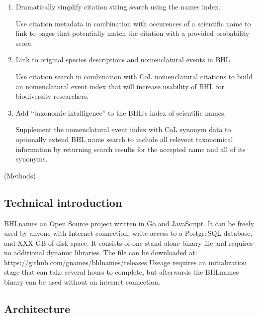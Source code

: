 \documentclass[
]{article}
\begin{document}
\begin{enumerate}
\def\labelenumi{\arabic{enumi}.}
\item
  Dramatically simplify citation string search using the names index.

  Use citation metadata in combination with occurences of a scientific
  name to link to pages that potentially match the citation with a
  provided probability score.
\item
  Link to original species descriptions and nomenclatural events in BHL.

  Use citation search in combination with CoL nomenclatural citations to
  build an nomenclatural event index that will increase usability of BHL
  for biodiversity researchers.
\item
  Add ``taxonomic intalligence'' to the BHL's index of scientific names.

  Supplement the nomenclatural event index with CoL synonym data to
  optionally extend BHL name search to include all relevent taxonomical
  information by returning search results for the accepted name and all
  of its synonyms.
\end{enumerate}

(Methods)

\hypertarget{technical-introduction}{%
\subsection{Technical introduction}\label{technical-introduction}}

BHLnames an Open Source project written in Go and JavaScript. It can be
freely used by anyone with Internet connection, write access to a
PostgreSQL database, and XXX GB of disk space. It consists of one
stand-alone binary file and requires no additional dynamic libraries.
The file can be downloaded at:
https://github.com/gnames/bhlnames/releases Useage requires an
initialization stage that can take several hours to complete, but
afterwards the BHLnames binary can be used without an internet
connection.

\hypertarget{architecture}{%
\subsection{Architecture}\label{architecture}}
\end{document}
